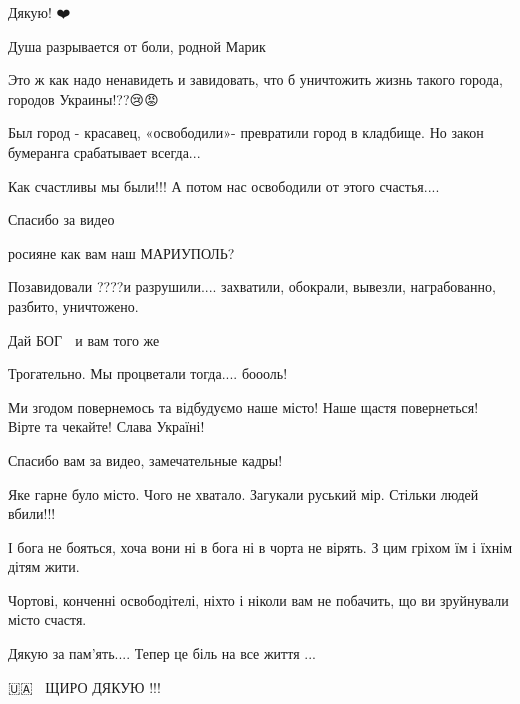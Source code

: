 
Дякую! ❤️🫶🇺🇦


Душа разрывается от боли, родной Марик


Это ж как надо ненавидеть и завидовать, что б уничтожить жизнь такого города,
городов Украины!??😢😡


Был город - красавец, «освободили»- превратили город в кладбище. Но закон
бумеранга срабатывает всегда...


Как счастливы мы были!!! А потом нас освободили от этого счастья....


Спасибо за видео


росияне как вам наш МАРИУПОЛЬ?

Позавидовали ????и разрушили.... захватили, обокрали, вывезли, награбованно,
разбито, уничтожено.

Дай БОГ 🙏 и вам того же


Трогательно. Мы процветали тогда.... боооль!


Ми згодом повернемось та відбудуємо наше місто! Наше щастя повернеться! Вірте
та чекайте! Слава Україні!


Спасибо вам за видео, замечательные кадры! 🤗🇺🇦


Яке гарне було місто. Чого не хватало. Загукали руський мір. Стільки людей
вбили!!!

І бога не бояться, хоча вони ні в бога ні в чорта не вірять. З цим гріхом їм і
їхнім дітям жити.


Чортові, конченні освободітелі, ніхто і ніколи вам не побачить, що ви
зруйнували місто счастя.


Дякую за пам'ять.... Тепер це біль на все життя ...


🇺🇦💙💛 ЩИРО ДЯКУЮ !!! 🌺🌹💙💛

